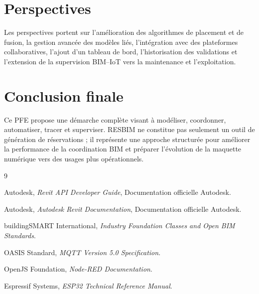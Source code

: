 \documentclass[12pt,a4paper]{report}
\begin{document}
\section*{Perspectives}
Les perspectives portent sur l'amélioration des algorithmes de placement et de fusion, la gestion avancée des modèles liés, l'intégration avec des plateformes collaboratives, l'ajout d'un tableau de bord, l'historisation des validations et l'extension de la supervision BIM--IoT vers la maintenance et l'exploitation.

\section*{Conclusion finale}
Ce PFE propose une démarche complète visant à modéliser, coordonner, automatiser, tracer et superviser. RESBIM ne constitue pas seulement un outil de génération de réservations ; il représente une approche structurée pour améliorer la performance de la coordination BIM et préparer l'évolution de la maquette numérique vers des usages plus opérationnels.

\begin{thebibliography}{9}

Autodesk, \textit{Revit API Developer Guide}, Documentation officielle Autodesk.

Autodesk, \textit{Autodesk Revit Documentation}, Documentation officielle Autodesk.

buildingSMART International, \textit{Industry Foundation Classes and Open BIM Standards}.

OASIS Standard, \textit{MQTT Version 5.0 Specification}.

OpenJS Foundation, \textit{Node-RED Documentation}.

Espressif Systems, \textit{ESP32 Technical Reference Manual}.

\end{thebibliography}

\appendix
\end{document}
